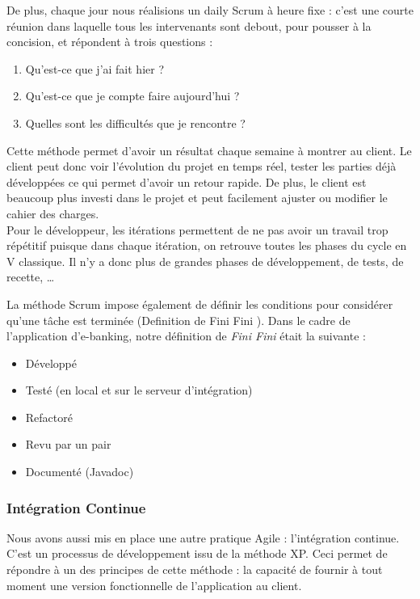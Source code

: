 De plus, chaque jour nous réalisions un \flqq{}daily Scrum\frqq{} à heure fixe : c'est une courte réunion dans laquelle tous les intervenants sont debout, pour pousser à la concision, et répondent à trois questions :
\begin{enumerate}
	\item Qu'est-ce que j'ai fait hier ?
	
	\item Qu'est-ce que je compte faire aujourd'hui ?
	
	\item Quelles sont les difficultés que je rencontre ?\\
\end{enumerate}

Cette méthode permet d'avoir un résultat chaque semaine à montrer au client. Le client peut donc voir l'évolution du projet en temps réel, tester les parties déjà développées ce qui permet d'avoir un retour rapide. De plus, le client est beaucoup plus investi dans le projet et peut facilement ajuster ou modifier le cahier des charges.\\

Pour le développeur, les itérations permettent de ne pas avoir un travail trop répétitif puisque dans chaque itération, on retrouve toutes les phases du cycle en V classique. Il n'y a donc plus de grandes phases de développement, de tests, de recette, \dots{}

La méthode Scrum impose également de définir les conditions pour considérer qu'une tâche est terminée (Definition de \og Fini Fini \fg{}). Dans le cadre de l'application d'e-banking, notre définition de \textit{Fini Fini} était la suivante :
\begin{itemize}
	\item Développé
	\item Testé (en local et sur le serveur d'intégration)
	\item Refactoré
	\item Revu par un pair
	\item Documenté (Javadoc)
\end{itemize}

\subsubsection{Intégration Continue}

Nous avons aussi mis en place une autre pratique Agile : l'intégration continue. C'est un processus de développement issu de la méthode XP. Ceci permet de répondre à un des principes de cette méthode : la capacité de fournir à tout moment une version fonctionnelle de l'application au client.

